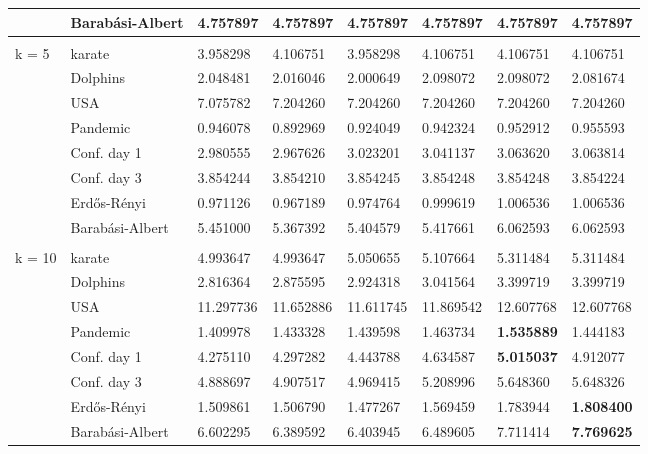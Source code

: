 \documentclass[11pt]{article}
\theoremstyle{definition}
\begin{document}
\begin{table}
\begin{center}
{\begin{tabular}{ | l | l | l | l | l | l | l | l | }
                & Barab\'asi-Albert & 4.757897& 4.757897& 4.757897& 4.757897& 4.757897& 4.757897 \\ \hline
                & & & & & & & \\ \hline
                k = 5 & karate & 3.958298& 4.106751& 3.958298& 4.106751& 4.106751& 4.106751 \\ \hline
                & Dolphins & 2.048481& 2.016046& 2.000649& 2.098072& 2.098072& 2.081674 \\ \hline
                & USA & 7.075782& 7.204260& 7.204260& 7.204260& 7.204260& 7.204260 \\ \hline
                & Pandemic & 0.946078& 0.892969& 0.924049& 0.942324& 0.952912& 0.955593 \\ \hline
                & Conf. day 1 & 2.980555& 2.967626& 3.023201& 3.041137& 3.063620& 3.063814 \\ \hline
                & Conf. day 3 & 3.854244& 3.854210& 3.854245& 3.854248& 3.854248& 3.854224 \\ \hline
                & Erd\H{o}s-R\'enyi & 0.971126& 0.967189& 0.974764& 0.999619& 1.006536& 1.006536 \\ \hline
                & Barab\'asi-Albert & 5.451000& 5.367392& 5.404579& 5.417661& 6.062593& 6.062593 \\ \hline
                & & & & & & & \\ \hline
                k = 10 & karate & 4.993647& 4.993647& 5.050655& 5.107664& 5.311484& 5.311484 \\ \hline
                & Dolphins & 2.816364& 2.875595& 2.924318& 3.041564& 3.399719& 3.399719 \\ \hline
                & USA & 11.297736& 11.652886& 11.611745& 11.869542& 12.607768& 12.607768 \\ \hline
                & Pandemic & 1.409978& 1.433328& 1.439598& 1.463734& \textbf{1.535889} & 1.444183 \\ \hline
                & Conf. day 1 & 4.275110& 4.297282& 4.443788& 4.634587& \textbf{5.015037} & 4.912077 \\ \hline
                & Conf. day 3 & 4.888697& 4.907517& 4.969415& 5.208996& 5.648360& 5.648326 \\ \hline
                & Erd\H{o}s-R\'enyi & 1.509861& 1.506790& 1.477267& 1.569459& 1.783944& \textbf{1.808400} \\ \hline
                & Barab\'asi-Albert & 6.602295& 6.389592& 6.403945& 6.489605& 7.711414& \textbf{7.769625} \\ \hline

\end{tabular}}
\end{center}
\end{table}
\end{document}
